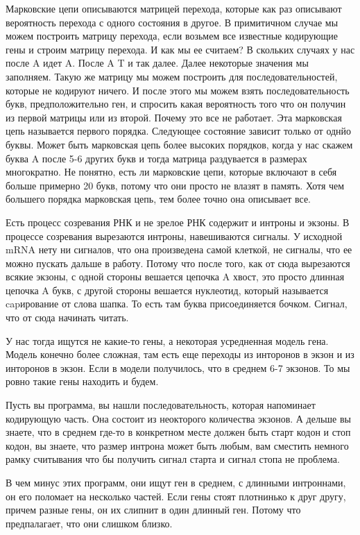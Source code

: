 Марковские цепи описываются матрицей перехода, которые как раз описывают 
вероятность перехода с одного состояния в другое. В примитичном случае 
мы можем построить матрицу перехода, если возьмем все известные кодирующие гены и 
строим матрицу перехода. 
И как мы ее считаем? В скольких случаях у нас после A идет A. После A T и так
далее. Далее некоторые значения мы заполняем. Такую же 
матрицу мы можем построить для последовательностей, которые не кодируют ничего. 
И после этого мы можем взять последовательность 
букв, предположительно ген, и спросить какая 
вероятность того что он получин из первой 
матрицы или из второй. Почему это все не работает. 
Эта марковская цепь называется первого порядка. 
Следующее состояние зависит только от однйо буквы. Может быть 
марковская цепь более высоких порядков, 
когда у нас скажем буква A после 5-6 других букв и 
тогда матрица раздувается в размерах 
многократно. Не понятно, есть ли 
марковские цепи, которые включают в себя больше примерно 20 букв, 
потому что они просто не влазят в память. Хотя чем большего 
порядка марковская цепь, тем 
более точно она описывает все. 

Есть процесс созревания РНК и не зрелое РНК содержит и интроны и экзоны. 
В процессе созревания 
вырезаются интроны, навешиваются сигналы. У исходной mRNA нету ни 
сигналов, что она произведена самой клеткой, 
не сигналы, что ее можно пускать дальше в работу. Потому что 
после того, как от сюда вырезаются всякие экзоны, с
одной стороны вешается цепочка A хвост, это просто 
длинная цепочка A букв, с другой стороны вешается нуклеотид, 
который называется capирование от слова шапка. То есть 
там буква присоединяется бочком. Сигнал, что от 
сюда начинать читать. 

У нас тогда ищутся не какие-то гены, а некоторая 
усредненная модель гена. Модель конечно более сложная, 
там есть еще переходы из инторонов в экзон и из 
инторонов в экзон. Если в модели получилось, что 
в среднем 6-7 экзонов. То мы ровно такие гены находить и будем. 

Пусть вы программа, вы нашли последовательность, которая 
напоминает кодирующую часть. Она состоит из неокторого 
количества экзонов. А дельше вы знаете, что 
в среднем где-то в конкретном месте должен быть старт кодон и стоп
кодон, вы знаете, что размер интрона может быть 
любым, вам сместить немного рамку считывания что бы 
получить сигнал старта и сигнал стопа не проблема. 

В чем минус этих программ, они ищут ген в среднем, с длинными 
интроннами, он его поломает на несколько частей. Если гены 
стоят плотнинько к друг другу, причем разные гены, он 
их слипнит в один длинный ген. Потому что предпалагает, что они слишком близко. 


